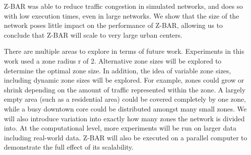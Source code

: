 \documentclass[conference]{IEEEtran}
\begin{document}
Z-BAR was able to reduce traffic congestion in simulated networks, and does so with low execution times, even in large networks. We show that the size of the network poses little impact on the performance of Z-BAR, allowing us to conclude that Z-BAR will scale to very large urban centers.

There are multiple areas to explore in terms of future work. Experiments in this work used a zone radius r of 2. Alternative zone sizes will be explored to determine the optimal zone size. In addition, the idea of variable zone sizes, including dynamic zone sizes will be explored. For example, zones could grow or shrink depending on the amount of traffic represented within the zone. A largely empty area (such as a residential area) could be covered completely by one zone, while a busy downtown core could be distributed amongst many small zones. We will also introduce variation into exactly how many zones the network is divided into. At the computational level, more experiments will be run on larger data including real-world data. Z-BAR will also be executed on a parallel computer to demonstrate the full effect of its scalability.
\end{document}

